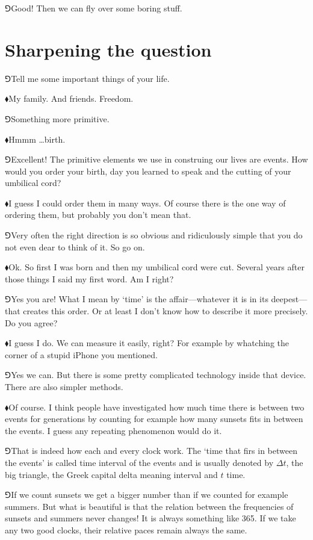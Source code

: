 \documentclass[10pt,oneside%
]{memoir}
\newcommand{\hea}{\(\blacklozenge\)\;}
\newcommand{\heb}{\(\Game\)\;}
\begin{document}
\heb Good! Then we can fly over some boring stuff.

\section{Sharpening the question}
\heb Tell me some important things of your life.

\hea My family. And friends. Freedom.

\heb Something more primitive.

\hea Hmmm \ldots birth.

\heb Excellent! The primitive elements we use in construing our lives are events. How would you order your birth, day you learned to speak and the cutting of your umbilical cord?

\hea I guess I could order them in many ways. Of course there is the one way of ordering them, but probably you don't mean that.

\heb Very often the right direction is so obvious and ridiculously simple that you do not even dear to think of it. So go on.

\hea Ok. So first I was born and then my umbilical cord were cut. Several years after those things I said my first word. Am I right?

\heb Yes you are! What I mean by `time' is the affair---whatever it is in its deepest---that creates this order. Or at least I don't know how to describe it more precisely. Do you agree?

\hea I guess I do. We can measure it easily, right? For example by whatching the corner of a stupid iPhone you mentioned.

\heb Yes we can. But there is some pretty complicated technology inside that device. There are also simpler methods.

\hea Of course. I think people have investigated how much time there is between two events for generations by counting for example how many sunsets fits in between the events. I guess any repeating phenomenon would do it.

\heb That is indeed how each and every clock work. The `time that firs in between the events' is called time interval of the events and is usually denoted by \(\Delta t\), the big triangle, the Greek capital delta meaning interval and \(t\) time.

\heb If we count sunsets we get a bigger number than if we counted for example summers. But what is beautiful is that the relation between the frequencies of sunsets and summers never changes! It is always something like 365. If we take any two good clocks, their relative paces remain always the same.
\end{document}
